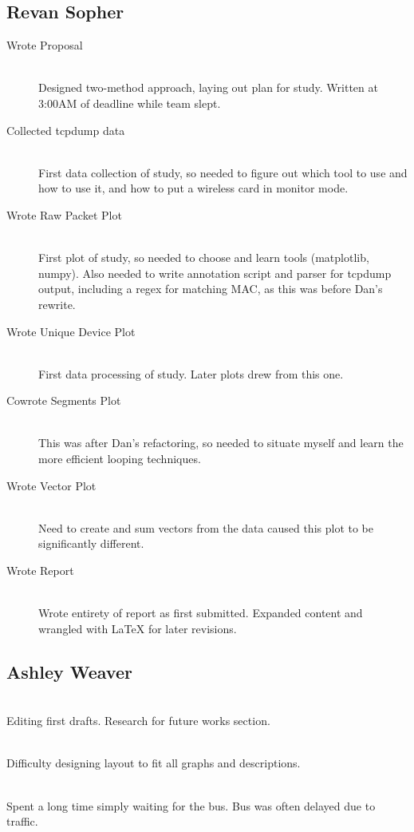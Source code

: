 \documentclass[12pt,journal,compsoc]{IEEEtran} %
\newcommand{\ditem}[2]{\item[#1] \hfill \\ #2}
\begin{document}
\subsection*{Revan Sopher}
\begin{description}
\item [Wrote Proposal] \hfill \\
	Designed two-method approach, laying out plan for study. Written at 3:00AM of deadline while team slept.
\item [Collected tcpdump data] \hfill \\
	First data collection of study, so needed to figure out which tool to use and how to use it, and how to put a wireless card in monitor mode.
\item [Wrote Raw Packet Plot] \hfill \\
	First plot of study, so needed to choose and learn tools (matplotlib, numpy). Also needed to write annotation script and parser for tcpdump output, including a regex for matching MAC, as this was before Dan's rewrite.
\item [Wrote Unique Device Plot] \hfill \\
	First data processing of study. Later plots drew from this one.
\item [Cowrote Segments Plot] \hfill \\
	This was after Dan's refactoring, so needed to situate myself and learn the more efficient looping techniques.
\item [Wrote Vector Plot] \hfill \\
	Need to create and sum vectors from the data caused this plot to be significantly different.
\item [Wrote Report] \hfill \\
	Wrote entirety of report as first submitted. Expanded content and wrangled with LaTeX for later revisions.
\end{description}

\subsection*{Ashley Weaver}
\begin{description}{}
\ditem{Cowrote report}{
	Editing first drafts.
	Research for future works section.
}
\ditem{Cowrote Poster}{
	Difficulty designing layout to fit all graphs and descriptions.
}
\ditem{Collected bus data}{
	Spent a long time simply waiting for the bus.
	Bus was often delayed due to traffic.
}
\end{description}

\printbibliography
\end{document}

